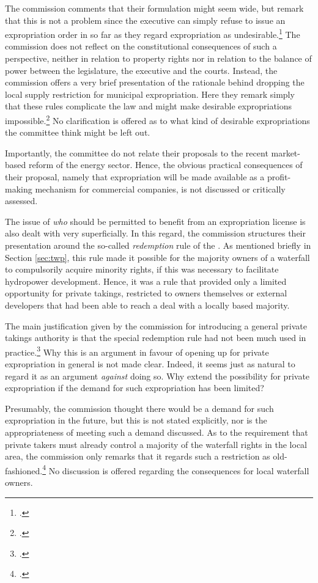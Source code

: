 The commission comments that their formulation might seem wide, but remark that this is not a problem since the executive can simply refuse to issue an expropriation order in so far as they regard expropriation as undesirable.\footcite[235]{nou94} The commission does not reflect on the  constitutional consequences of such a perspective, neither in relation to property rights nor in relation to the balance of power between the legislature, the executive and the courts. Instead, the commission offers a very brief presentation of the rationale behind dropping the local supply restriction for municipal expropriation. Here they remark simply that these rules complicate the law and might make desirable expropriations impossible.\footcite[235]{nou94} No clarification is offered as to what kind of desirable expropriations the committee think might be left out. 

Importantly, the committee do not relate their proposals to the recent market-based reform of the energy sector. Hence, the obvious practical consequences of their proposal, namely that expropriation will be made available as a profit-making mechanism for commercial companies, is not discussed or critically assessed.

The issue of {\it who} should be permitted to benefit from an expropriation license is also dealt with very superficially. In this regard, the commission structures their presentation around the so-called {\it redemption} rule of the \cite{wra40}. As mentioned briefly in Section \ref{sec:twp}, this rule made it possible for the majority owners of a waterfall to compulsorily acquire minority rights, if this was necessary to facilitate hydropower development. Hence, it was a rule that provided only a limited opportunity for private takings, restricted to owners themselves or external developers that had been able to reach a deal with a locally based majority.

The main justification given by the commission for introducing a general private takings authority is that the special redemption rule had not been much used in practice.\footcite[236]{nou94} Why this is an argument in favour of opening up for private expropriation in general is not made clear. Indeed, it seems just as natural to regard it as an argument {\it against} doing so. Why extend the possibility for private expropriation if the demand for such expropriation has been limited? 

Presumably, the commission thought there would be a demand for such expropriation in the future, but this is not stated explicitly, nor is the appropriateness of meeting such a demand discussed. As to the requirement that private takers must already control a majority of the waterfall rights in the local area, the commission only remarks that it regards such a restriction as old-fashioned.\footcite[236]{nou94} No discussion is offered regarding the consequences for local waterfall owners.

